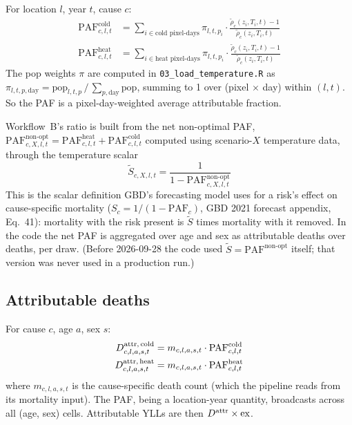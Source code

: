 \documentclass[11pt]{article}
\newcommand{\PAF}{\text{PAF}}
\begin{document}
For location $l$, year $t$, cause $c$:
\begin{align}
\PAF^{\text{cold}}_{c,l,t} &= \sum_{i \in \text{cold pixel-days}}
    \pi_{l,t,p_i} \cdot \frac{\tilde\rho_c(z_i, T_i, t) - 1}{\tilde\rho_c(z_i, T_i, t)} \label{eq:paf-cold} \\
\PAF^{\text{heat}}_{c,l,t} &= \sum_{i \in \text{heat pixel-days}}
    \pi_{l,t,p_i} \cdot \frac{\tilde\rho_c(z_i, T_i, t) - 1}{\tilde\rho_c(z_i, T_i, t)} \label{eq:paf-heat}
\end{align}
The pop weights $\pi$ are computed in
\texttt{03\_load\_temperature.R} as
$\pi_{l,t,p,\text{day}} = \text{pop}_{l,t,p} \,/\, \sum_{p,\text{day}}
\text{pop}$, summing to 1 over (pixel $\times$ day) within $(l, t)$. So
the PAF is a pixel-day-weighted average attributable fraction.

Workflow~B's ratio is built from the net non-optimal PAF,
$\PAF^{\text{non-opt}}_{c,X,l,t} = \PAF^{\text{heat}}_{c,l,t} +
\PAF^{\text{cold}}_{c,l,t}$ computed using scenario-$X$ temperature data,
through the temperature scalar
\begin{equation}
\tilde S_{c,X,l,t} = \frac{1}{1 - \PAF^{\text{non-opt}}_{c,X,l,t}}
\label{eq:S}
\end{equation}
This is the scalar definition GBD's forecasting model uses for a risk's
effect on cause-specific mortality ($S_c = 1/(1 - \PAF_c)$, GBD 2021
forecast appendix, Eq.~41): mortality with the risk present is
$\tilde S$ times mortality with it removed. In the code the net PAF is
aggregated over age and sex as attributable deaths over deaths, per draw.
(Before 2026-09-28 the code used $\tilde S = \PAF^{\text{non-opt}}$
itself; that version was never used in a production run.)

\subsection{Attributable deaths}

For cause $c$, age $a$, sex $s$:
\begin{align}
\mAttr[cold]_{c,l,a,s,t} &= m_{c,l,a,s,t} \cdot \PAF^{\text{cold}}_{c,l,t} \label{eq:attrib-cold} \\
\mAttr[heat]_{c,l,a,s,t} &= m_{c,l,a,s,t} \cdot \PAF^{\text{heat}}_{c,l,t} \label{eq:attrib-heat}
\end{align}
where $m_{c,l,a,s,t}$ is the cause-specific death count (which the
pipeline reads from its mortality input). The PAF, being a location-year
quantity, broadcasts across all (age, sex) cells. Attributable YLLs are
then $\mAttr \times \text{ex}$.
\end{document}
